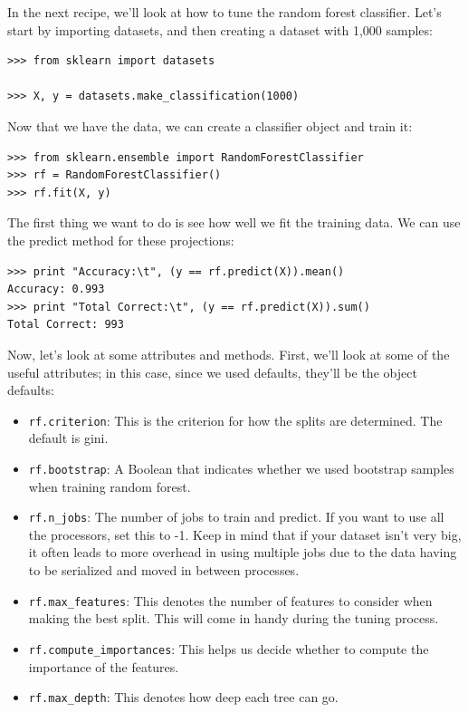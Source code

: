 \documentclass[SKL-MASTER.tex]{subfiles}
\begin{document}
In the next recipe, we'll look at how to tune the random forest classifier. Let's start by
importing datasets, and then creating a dataset with 1,000 samples:
\begin{framed}
\begin{verbatim}
>>> from sklearn import datasets

>>> X, y = datasets.make_classification(1000)
\end{verbatim}
\end{framed}
Now that we have the data, we can create a classifier object and train it:
\begin{framed}
	\begin{verbatim}
>>> from sklearn.ensemble import RandomForestClassifier
>>> rf = RandomForestClassifier()
>>> rf.fit(X, y)
\end{verbatim}
\end{framed}
The first thing we want to do is see how well we fit the training data. We can use the predict
method for these projections:
\begin{framed}
	\begin{verbatim}
>>> print "Accuracy:\t", (y == rf.predict(X)).mean()
Accuracy: 0.993
>>> print "Total Correct:\t", (y == rf.predict(X)).sum()
Total Correct: 993
\end{verbatim}
\end{framed}
Now, let's look at some attributes and methods.
First, we'll look at some of the useful attributes; in this case, since we used defaults, they'll be
the object defaults:
\begin{itemize}
\item  \texttt{rf.criterion}: This is the criterion for how the splits are determined. The default
is gini.
\item  \texttt{rf.bootstrap}: A Boolean that indicates whether we used bootstrap samples when
training random forest.
\item  \texttt{rf.n\_jobs}: The number of jobs to train and predict. If you want to use all the
processors, set this to -1. Keep in mind that if your dataset isn't very big, it often
leads to more overhead in using multiple jobs due to the data having to be serialized
and moved in between processes.
\item  \texttt{rf.max\_features}: This denotes the number of features to consider when making
the best split. This will come in handy during the tuning process.
\item  \texttt{rf.compute\_importances}: This helps us decide whether to compute the
importance of the features. 
\item  \texttt{rf.max\_depth}: This denotes how deep each tree can go.
\end{itemize}
\end{document}
